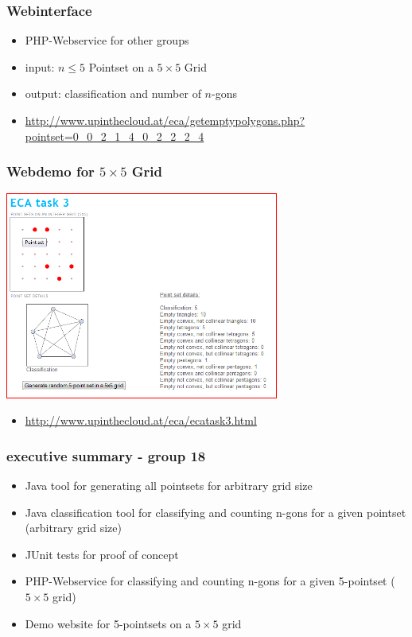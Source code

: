 
\begin{frame}
\frametitle{Webinterface}
 \begin{itemize}
  \item PHP-Webservice for other groups
  \item input: $n \leq 5$ Pointset on a $5 \times 5$ Grid
	\item output: classification and number of $n$-gons
	\item \url{http://www.upinthecloud.at/eca/getemptypolygons.php?pointset=0_0_2_1_4_0_2_2_2_4}
 \href{http://www.upinthecloud.at/eca/getemptypolygons.php?pointset=0_0_2_1_4_0_2_2_2_4}{}
 \end{itemize}
\end{frame}


\begin{frame}
\frametitle{Webdemo for $5 \times 5$ Grid}
\begin{center}
\includegraphics[width=9cm]{scshot.png}
\end{center}
 \begin{itemize}
  \item \url{http://www.upinthecloud.at/eca/ecatask3.html}
	  \href{http://www.upinthecloud.at/eca/ecatask3.html}{}
\end{itemize}
\end{frame}

\begin{frame}
\frametitle{executive summary - group 18}
\begin{itemize}
\item Java tool for generating all pointsets for arbitrary grid size
\item Java classification tool for classifying and counting n-gons for a given pointset (arbitrary grid size)
\item JUnit tests for proof of concept
\item PHP-Webservice for classifying and counting n-gons for a given 5-pointset ($5\times 5$ grid)
\item Demo website for 5-pointsets on a $5\times 5$ grid
\end{itemize}
\end{frame}



